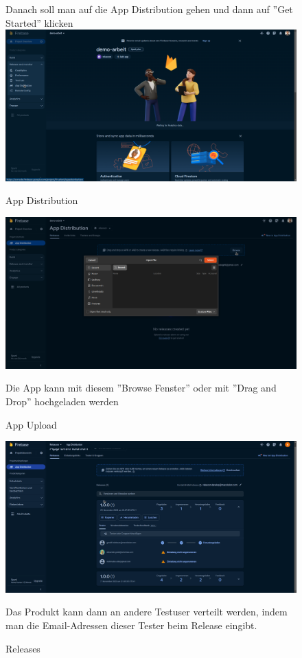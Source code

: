 \begin{figure}
  Danach soll man  auf die App Distribution gehen und dann auf ''Get Started'' klicken
  \includegraphics[width=\textwidth]{./pics/firebase3.png}
  \caption{App Distribution}
\end{figure}

\begin{figure}
  \includegraphics[width=\textwidth]{./pics/firebase4.png}
  \caption{App Upload}
  Die App kann mit diesem ''Browse Fenster'' oder mit ''Drag and Drop'' hochgeladen werden

\end{figure}



\begin{figure}
  \includegraphics[width=\textwidth]{./pics/firebase5.png}
  \caption{Releases}
  
  Das Produkt kann dann an andere Testuser verteilt werden, indem man die Email-Adressen dieser 
  Tester beim Release eingibt.
\end{figure}



